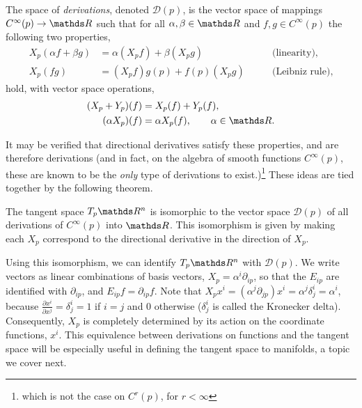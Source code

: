 \begin{defn}[Derivation]\label{def:derivations}
The space of \textit{derivations}, denoted $\mathscr{D}(p)$, is the vector space of mappings $C^{\infty}(p)\rightarrow \R$ such that for all $\alpha, \beta \in \R$ and $f, g \in C^{\infty}(p)$ the following two properties,
\begin{equation}\label{eq:linleibniz}
\begin{aligned}
X_p(\alpha f + \beta g) & = {} \alpha (X_p f) + \beta (X_p g) \qquad & \text{(linearity)},\\
X_p(fg) & = {} (X_p f)g(p) + f(p)(X_p g) \qquad & \text{(Leibniz rule)},
\end{aligned}
\end{equation}
hold, with vector space operations, 
\begin{equation}
\begin{aligned}
(X_p+Y_p)(f) &={} X_p(f) +Y_p(f), \\
(\alpha X_p)(f) &={}\alpha X_p (f), \qquad \alpha \in \R.
 \end{aligned}
 \end{equation}
\end{defn}
It may be verified that directional derivatives satisfy these properties, and are therefore derivations (and in fact, on the algebra of smooth functions $C^{\infty}(p)$, these are known to be the \textit{only} type of derivations to exist.)\footnote{which is not the case on $C^r(p)$, for $r<\infty$} These ideas are tied together by the following theorem. 
\begin{thm}
The tangent space $T_p\R^n$ is isomorphic to the vector space $\mathscr{D}(p)$ of all derivations of $C^{\infty}(p)$ into $\R$. This isomorphism is given by making each $X_p$ correspond to the directional derivative in the direction of $X_p$. 
\end{thm}

Using this isomorphism, we can {identify} $T_p\R^n$ with $\mathscr{D}(p)$. We write vectors as linear combinations of basis vectors, $X_p = \alpha^i \partial_{ip}$, so that the $E_{ip}$ are identified with $\partial_{ip}$, and $E_{ip}f = \partial_{ip} f$. Note that $X_p x^i = \left(\alpha^j \partial_{jp}\right) x^i = \alpha^j \delta^i_j = \alpha^i$, because $\frac{\partial x^i}{\partial x^j} = \delta^i_j = 1$ if $i=j$ and $0$ otherwise ($\delta^i_j$ is called the Kronecker delta). Consequently, $X_p$ is completely determined by its action on the coordinate functions, $x^i$. This equivalence between derivations on functions and the tangent space will be especially useful in defining the tangent space to manifolds, a topic we cover next. 

